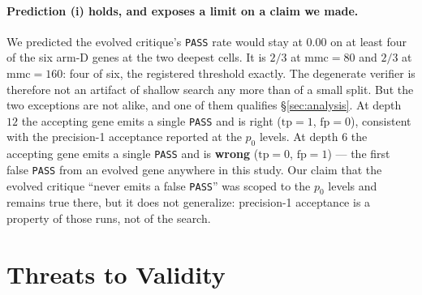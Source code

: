 \documentclass[11pt]{article}
\begin{document}
\paragraph{Prediction (i) holds, and exposes a limit on a claim we made.} We predicted the
evolved critique's \texttt{PASS} rate would stay at $0.00$ on at least four of the six arm-D
genes at the two deepest cells. It is $2/3$ at $\mathrm{mmc}=80$ and $2/3$ at
$\mathrm{mmc}=160$: four of six, the registered threshold exactly. The degenerate verifier is
therefore not an artifact of shallow search any more than of a small split. But the two
exceptions are not alike, and one of them qualifies \S\ref{sec:analysis}. At depth $12$ the
accepting gene emits a single \texttt{PASS} and is right ($\mathrm{tp}=1$, $\mathrm{fp}=0$),
consistent with the precision-1 acceptance reported at the $p_0$ levels. At depth $6$ the
accepting gene emits a single \texttt{PASS} and is \textbf{wrong} ($\mathrm{tp}=0$,
$\mathrm{fp}=1$) --- the first false \texttt{PASS} from an evolved gene anywhere in this study.
Our claim that the evolved critique ``never emits a false \texttt{PASS}'' was scoped to the $p_0$
levels and remains true there, but it does not generalize: precision-1 acceptance is a property
of those runs, not of the search.

\section{Threats to Validity}
\label{sec:threats}
\end{document}
